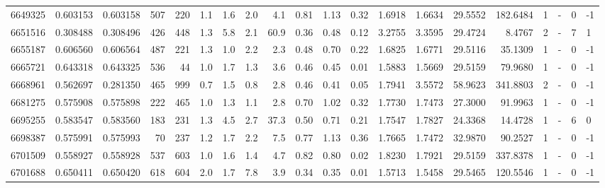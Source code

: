 \begin{tabular}{rrrrrrrrrrrrrrrrrlrl}
   6649325 & 0.603153 &   0.603158 &  507 &  220 &      1.1 &      1.6 &     2.0 &      4.1 &       0.81 &        1.13 &        0.32 &  1.6918 &  1.6634 &   29.5552 &  182.6484 &       1 &             - &        0 &        -1 \\
   6651516 & 0.308488 &   0.308496 &  426 &  448 &      1.3 &      5.8 &     2.1 &     60.9 &       0.36 &        0.48 &        0.12 &  3.2755 &  3.3595 &   29.4724 &    8.4767 &       2 &             - &        7 &         1 \\
   6655187 & 0.606560 &   0.606564 &  487 &  221 &      1.3 &      1.0 &     2.2 &      2.3 &       0.48 &        0.70 &        0.22 &  1.6825 &  1.6771 &   29.5116 &   35.1309 &       1 &             - &        0 &        -1 \\
   6665721 & 0.643318 &   0.643325 &  536 &   44 &      1.0 &      1.7 &     1.3 &      3.6 &       0.46 &        0.45 &        0.01 &  1.5883 &  1.5669 &   29.5159 &   79.9680 &       1 &             - &        0 &        -1 \\
   6668961 & 0.562697 &   0.281350 &  465 &  999 &      0.7 &      1.5 &     0.8 &      2.8 &       0.46 &        0.41 &        0.05 &  1.7941 &  3.5572 &   58.9623 &  341.8803 &       2 &             - &        0 &        -1 \\
   6681275 & 0.575908 &   0.575898 &  222 &  465 &      1.0 &      1.3 &     1.1 &      2.8 &       0.70 &        1.02 &        0.32 &  1.7730 &  1.7473 &   27.3000 &   91.9963 &       1 &             - &        0 &        -1 \\
   6695255 & 0.583547 &   0.583560 &  183 &  231 &      1.3 &      4.5 &     2.7 &     37.3 &       0.50 &        0.71 &        0.21 &  1.7547 &  1.7827 &   24.3368 &   14.4728 &       1 &             - &        6 &         0 \\
   6698387 & 0.575991 &   0.575993 &   70 &  237 &      1.2 &      1.7 &     2.2 &      7.5 &       0.77 &        1.13 &        0.36 &  1.7665 &  1.7472 &   32.9870 &   90.2527 &       1 &             - &        0 &        -1 \\
   6701509 & 0.558927 &   0.558928 &  537 &  603 &      1.0 &      1.6 &     1.4 &      4.7 &       0.82 &        0.80 &        0.02 &  1.8230 &  1.7921 &   29.5159 &  337.8378 &       1 &             - &        0 &        -1 \\
   6701688 & 0.650411 &   0.650420 &  618 &  604 &      2.0 &      1.7 &     7.8 &      3.9 &       0.34 &        0.35 &        0.01 &  1.5713 &  1.5458 &   29.5465 &  120.5546 &       1 &             - &        0 &        -1 \\

\end{tabular}
